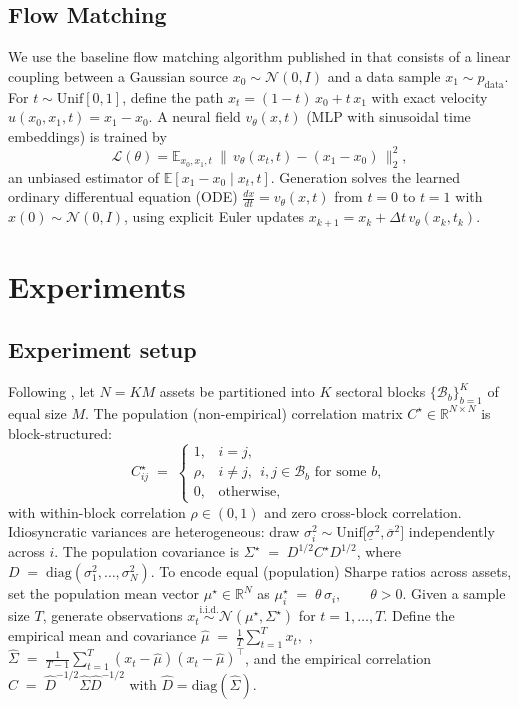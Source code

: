 \documentclass{article}
\begin{document}
\subsection{Flow Matching}
We use the baseline flow matching algorithm published in \cite{lipman2023} that consists of a linear coupling between a Gaussian source $x_0\sim\mathcal{N}(0,I)$ and a data sample $x_1\sim p_{\text{data}}$. For $t\sim\mathrm{Unif}[0,1]$, define the path $x_t=(1-t)\,x_0+t\,x_1$ with exact velocity $u(x_0,x_1,t)=x_1-x_0$. A neural field $v_\theta(x,t)$ (MLP with sinusoidal time embeddings) is trained by
\[
\mathcal{L}(\theta)=\mathbb{E}_{x_0,x_1,t}\ \bigl\|\,v_\theta(x_t,t)-(x_1-x_0)\,\bigr\|_2^2,
\]
an unbiased estimator of $\mathbb{E}[x_1-x_0\mid x_t,t]$. Generation solves the learned ordinary differentual equation (ODE) $\frac{dx}{dt}=v_\theta(x,t)$ from $t=0$ to $t=1$ with $x(0)\sim\mathcal{N}(0,I)$, using explicit Euler updates $x_{k+1}=x_k+\Delta t\,v_\theta(x_k,t_k)$.


\section{Experiments}\label{sec:experiment}

\subsection{Experiment setup}
Following \cite{mlam2020}, let $N=K M$ assets be partitioned into $K$ sectoral blocks $\{\mathcal{B}_b\}_{b=1}^K$ of equal size $M$. The population (non-empirical) correlation matrix $C^\star\in\mathbb{R}^{N\times N}$ is block-structured:
\[
C^\star_{ij} \;=\;
\begin{cases}
1, & i=j,\\[2pt]
\rho, & i\neq j,\ \ i,j\in \mathcal{B}_b \text{ for some } b,\\[2pt]
0, & \text{otherwise},
\end{cases}
\]
with within-block correlation $\rho\in (0,1)$ and zero cross-block correlation. Idiosyncratic variances are heterogeneous: draw $\sigma_i^2 \sim \mathrm{Unif}\big[\underline{\sigma}^2,\overline{\sigma}^2\big]$ independently across $i$. The population covariance is
$\Sigma^\star \;=\; D^{1/2} C^\star D^{1/2}$, where $D \;=\; \mathrm{diag}(\sigma_1^2,\ldots,\sigma_N^2)$.
To encode equal (population) Sharpe ratios across assets, set the population mean vector $\mu^\star\in\mathbb{R}^N$ as $\mu_i^\star \;=\; \theta\, \sigma_i, \qquad \theta>0$.
Given a sample size $T$, generate observations $x_t \overset{\text{i.i.d.}}{\sim} \mathcal{N}(\mu^\star,\Sigma^\star)$ for $t=1,\ldots,T$. Define the empirical mean and covariance
$\widehat{\mu} \;=\; \frac{1}{T}\sum_{t=1}^T x_t, $ ,  $\widehat{\Sigma} \;=\; \frac{1}{T-1}\sum_{t=1}^T (x_t-\widehat{\mu})(x_t-\widehat{\mu})^\top$,
and the empirical correlation $\widehat{C} \;=\; \widehat{D}^{-1/2}\widehat{\Sigma}\widehat{D}^{-1/2}$ with $\widehat{D}=\mathrm{diag}(\widehat{\Sigma})$.
\end{document}
